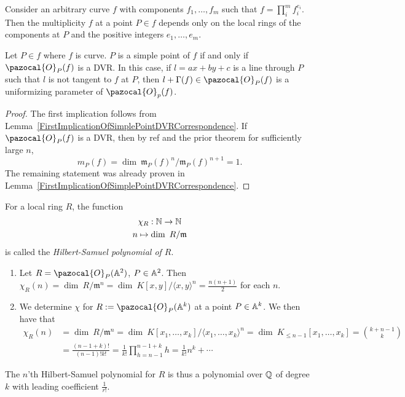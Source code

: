     \begin{remark}
        Consider an arbitrary curve $f$ with components $f_1,\dots,f_m$ such that $f= \prod_i^m f_i^{e_i}$. Then the multiplicity $f$ at a point $P\in f$ depends only on the local rings of the components at $P$ and the positive integers $e_1,\dots,e_m$.    
    \end{remark}
    \begin{theorem}\label{SimplePointIffLocalRingDVR}
        Let $P\in f$ where $f$ is curve. $P$ is a simple point of $f$ if and only if $\pazocal{O}_P(f)$ is a DVR. In this case, if $l=ax+by+c$ is a line through $P$ such that $l$ is not tangent to $f$ at $P$, then $l+\Gamma(f)\in \pazocal{O}_P(f)$ is a uniformizing parameter of $\pazocal{O}_p(f)$.
    \end{theorem}
    \begin{proof}
        The first implication follows from Lemma~\ref{FirstImplicationOfSimplePointDVRCorrespondence}. If $\pazocal{O}_P(f)$ is a DVR, then by {\large ref} and the prior theorem for sufficiently large $n$, 
        $$m_P(f) = \dim \ \mathfrak{m}_P(f)^n/\mathfrak{m}_P(f)^{n+1} = 1.$$
        The remaining statement was already proven in Lemma~\ref{FirstImplicationOfSimplePointDVRCorrespondence}.
    \end{proof}
    \begin{remark}
        For a local ring $R$, the function 
        \begin{gather*}
            \chi_{R}:\mathbb{N} \rightarrow \mathbb{N}\\
            n \mapsto \dim\ R/\mathfrak{m}
        \end{gather*}
        is called the \textit{Hilbert-Samuel polynomial of $R$}.
    \end{remark}
    \begin{example}
        \begin{enumerate}
            \item Let $R=\pazocal{O}_P(\A^2)$, $P\in \mathbb{A}^2$. Then $\chi_R(n)=\dim\ R/\mathfrak{m}^n = \dim\ K[x,y]/\langle x,y\rangle ^n = \frac{n(n+1)}{2}$ for each $n$.
            \item We determine $\chi$ for $R:=\pazocal{O}_P(\A^k)$ at a point $P\in \mathbb{A}^k$. We then have that 
            \begin{align*} 
                \chi_R(n)&=\dim \ R/\mathfrak{m}^n = \dim \ K[x_1,\dots,x_k]/\langle x_1,\dots,x_k\rangle^n = \dim \ K_{\leq n-1}[x_1,\dots,x_k] = {k+n-1\choose k}\\ 
                &= \frac{(n-1+k)!}{(n-1)!k!} = \frac{1}{k!}\prod_{h = n-1}^{n-1+k} h = \frac{1}{k!}n^k+ \cdots
            \end{align*}
        \end{enumerate}
        The $n$'th Hilbert-Samuel polynomial for $R$ is thus a polynomial over $\mathbb{Q}$ of degree $k$ with leading coefficient $\frac{1}{r!}$.
    \end{example}
